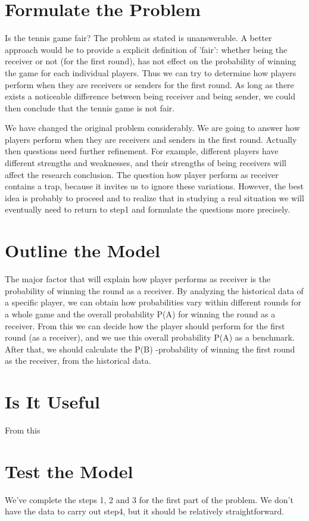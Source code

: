 \documentclass[12pt,letterpaper]{article}
\theoremstyle{definition}
\begin{document}
\section{Formulate the Problem} 
Is the tennis game fair? The problem as stated is unanswerable. A better approach would be to provide a explicit definition of 'fair': whether being the receiver or not (for the first round), has not effect on the probability of winning the game for each individual players. Thus we can try to determine how players perform when they are receivers or senders for the first round. As long as there exists a noticeable difference between being receiver and being sender, we could then conclude that the tennis game is not fair.

We have changed the original problem considerably. We are going to answer how players perform when they are receivers and senders in the first round. Actually then questions need further refinement. For example, different players have different strengths and weaknesses, and their strengths of being receivers will affect the research conclusion. The question how player perform as receiver contains a trap, because it invites us to ignore these variations. However, the best idea is probably to proceed and to realize that in studying a real situation we will eventually need to return to step1 and formulate the questions more precisely.

\section{Outline the Model}
The major factor that will explain how player performs as receiver is the probability of winning the round as a receiver. By analyzing the historical data of a specific player, we can obtain how probabilities vary within different rounds for a whole game and the overall probability P(A) for winning the round as a receiver. From this we can decide how the player should perform for the first round (as a receiver), and we use this overall probability P(A) as a benchmark. After that, we should calculate the P(B) -probability of winning the first round as the receiver, from the historical data. 
  
\section{Is It Useful}
From this

\section{Test the Model}
We've complete the steps 1, 2 and 3 for the first part of the problem. We don't have the data to carry out step4, but it should be relatively straightforward.
\end{document}
